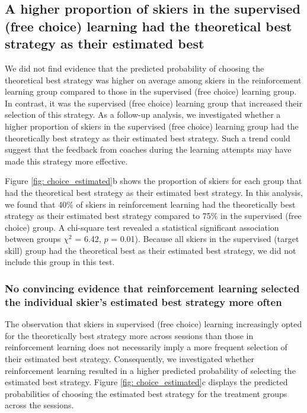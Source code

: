 \subsection{A higher proportion of skiers in the supervised (free choice) learning had the theoretical best strategy as their estimated best}\label{result_strategychoice_proportion}
We did not find evidence that the predicted probability of choosing the theoretical best strategy was higher on average among skiers in the reinforcement learning group compared to those in the supervised (free choice) learning group. In contrast, it was the supervised (free choice) learning group that increased their selection of this strategy. As a follow-up analysis, we investigated whether a higher proportion of skiers in the supervised (free choice) learning group had the theoretically best strategy as their estimated best strategy. Such a trend could suggest that the feedback from coaches during the learning attempts may have made this strategy more effective. 

Figure \ref{fig: choice_estimated}b shows the proportion of skiers for each group that had the theoretical best strategy as their estimated best strategy. In this analysis, we found that 40\% of skiers in reinforcement learning had the theoretically best strategy as their estimated best strategy compared to 75\% in the supervised (free choice) group. A chi-square test revealed a statistical significant association between groups $\chi^2$ = 6.42, $p$ = 0.01). Because all skiers in the supervised (target skill) group had the theoretical best as their estimated best strategy, we did not include this group in this test.  


\subsubsection{No convincing evidence that reinforcement learning selected the individual skier's estimated best strategy more often}\label{result_strategychoice_estbest}
The observation that skiers in supervised (free choice) learning increasingly opted for the theoretically best strategy more across sessions than those in reinforcement learning does not necessarily imply a more frequent selection of their estimated best strategy. Consequently, we investigated whether reinforcement learning resulted in a higher predicted probability of selecting the estimated best strategy. Figure \ref{fig: choice_estimated}c displays the predicted probabilities of choosing the estimated best strategy for the treatment groups across the sessions. 

